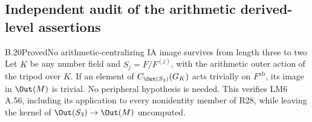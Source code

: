 \subsection{Independent audit of the arithmetic derived-level assertions}

\begin{statement}{B.20}{Proved}{No arithmetic-centralizing IA image survives from length three to two}
Let $K$ be any number field and $S_j=F/F^{(j)}$, with the
arithmetic outer action of the tripod over $K$. If an element of
$C_{\Out(S_3)}(G_K)$ acts trivially on $F^{\mathrm{ab}}$, its
image in $\Out(M)$ is trivial. No peripheral hypothesis is needed.
This verifies LM6 A.56, including its application to every
nonidentity member of R28, while leaving the kernel of
$\Out(S_3)\to\Out(M)$ uncomputed.
\end{statement}
